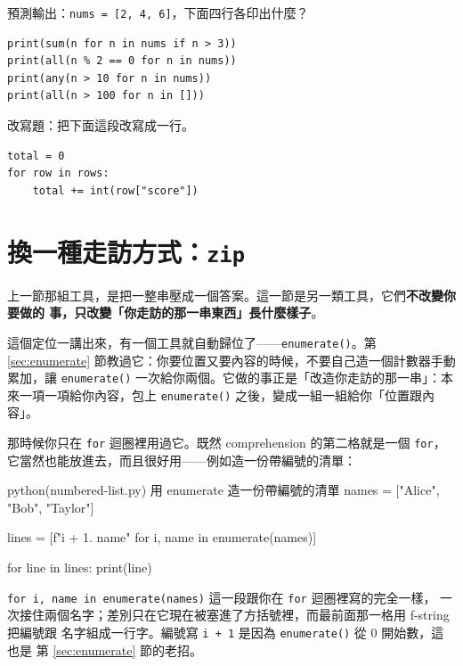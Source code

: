 \begin{drills}[label=drills:reducing-builtins]
\item 預測輸出：\texttt{nums = [2, 4, 6]}，下面四行各印出什麼？
\begin{verbatim}
print(sum(n for n in nums if n > 3))
print(all(n % 2 == 0 for n in nums))
print(any(n > 10 for n in nums))
print(all(n > 100 for n in []))
\end{verbatim}
\item 改寫題：把下面這段改寫成一行。
\begin{verbatim}
total = 0
for row in rows:
    total += int(row["score"])
\end{verbatim}
\end{drills}

\section{換一種走訪方式：\texttt{zip}}
\label{sec:zip-walk}

上一節那組工具，是把一整串壓成一個答案。這一節是另一類工具，它們\textbf{不改變你要做的
事，只改變「你走訪的那一串東西」長什麼樣子}。

這個定位一講出來，有一個工具就自動歸位了——\texttt{enumerate()}。第 \ref{sec:enumerate}
節教過它：你要位置又要內容的時候，不要自己造一個計數器手動累加，讓 \texttt{enumerate()}
一次給你兩個。它做的事正是「改造你走訪的那一串」：本來一項一項給你內容，包上
\texttt{enumerate()} 之後，變成一組一組給你「位置跟內容」。

那時候你只在 \texttt{for} 迴圈裡用過它。既然 comprehension 的第二格就是一個
\texttt{for}，它當然也能放進去，而且很好用——例如造一份帶編號的清單：

\begin{example}{python}{(numbered-list.py) 用 enumerate 造一份帶編號的清單}
names = ["Alice", "Bob", "Taylor"]

lines = [f"{i + 1}. {name}" for i, name in enumerate(names)]

for line in lines:
    print(line)
\end{example}


\texttt{for i, name in enumerate(names)} 這一段跟你在 \texttt{for} 迴圈裡寫的完全一樣，
一次接住兩個名字；差別只在它現在被塞進了方括號裡，而最前面那一格用 f-string 把編號跟
名字組成一行字。編號寫 \texttt{i + 1} 是因為 \texttt{enumerate()} 從 0 開始數，這也是
第 \ref{sec:enumerate} 節的老招。

